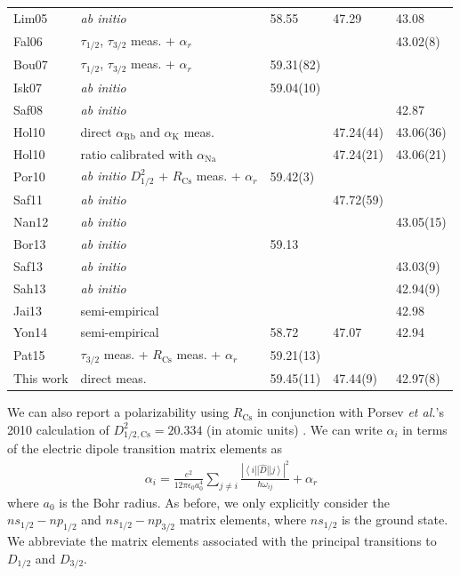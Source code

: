 \documentclass[twocolumn,pra,showpacs,superscriptaddress,longbibliography]{revtex4-1}   %
\newcommand{\brakett}[3]{\left.\left\langle #1 \right|\right|#2\left|\left| #3 \right\rangle\right.}
\newcommand{\ak}{\alpha_{\textrm{K}}}
\newcommand{\arb}{\alpha_{\textrm{Rb}}}
\newcommand{\rcs}{R_{\mathrm{Cs}}}
\newcommand{\etal}{\textit{et al.}}
\newcommand{\abinit}{\textit{ab initio} }
\begin{document}
\begin{table}
\begin{center}
\begin{tabular}{l l l l l}
Lim05 \cite{Lim2005} & \abinit & 58.55 & 47.29 & 43.08 \\
Fal06 \cite{Falke2006a,Safronova2006}  & $\tau_{1/2}$, $\tau_{3/2}$ meas. + $\alpha_r$& & & 43.02(8) \\
Bou07 \cite{Bouloufa2007,Derevianko2001} & $\tau_{1/2}$, $\tau_{3/2}$ meas. + $\alpha_r$ & 59.31(82) & & \\
Isk07 \cite{Iskrenova-Tchoukova2007} & \abinit & 59.04(10) & & \\
Saf08 \cite{Safronova2008} & \abinit & & & 42.87 \\
Hol10 \cite{Holmgren2010} & direct $\arb$ and $\ak$ meas. & & 47.24(44) & 43.06(36) \\
Hol10 \cite{Holmgren2010,Ekstrom1995} & ratio calibrated with $\alpha_{\text{Na}}$ & & 47.24(21) & 43.06(21) \\
Por10 \cite{Porsev2010,Rafac1998,Derevianko2001} & \abinit $D_{1/2}^2$ + $\rcs$ meas. + $\alpha_r$ & 59.42(3) & & \\
Saf11 \cite{Safronova2011} & \abinit & & 47.72(59) & \\
Nan12 \cite{Nandy2012} & \abinit & & & 43.05(15) \\
Bor13 \cite{Borschevsky2013} & \abinit & 59.13 & & \\
Saf13 \cite{Safronova2013} & \abinit & & & 43.03(9) \\
Sah13 \cite{Sahoo2013} & \abinit & & & 42.94(9) \\
Jai13 \cite{Jiang2013} & semi-empirical & & & 42.98 \\
Yon14 \cite{Y.-B.2014} & semi-empirical & 58.72 & 47.07 & 42.94 \\
Pat15 \cite{Patterson2015,Rafac1998,Derevianko2001}  & $\tau_{3/2}$ meas. + $\rcs$ meas. + $\alpha_r$ & 59.21(13) & & \\
This work & direct meas. & 59.45(11) & 47.44(9) & 42.97(8) \\
\hline\hline
\end{tabular}
\end{center}
\end{table}
\endgroup

We can also report a polarizability using $\rcs$ \cite{Rafac1998} in conjunction with Porsev \etal's 2010 calculation of $D_{1/2,\mathrm{Cs}}^2 = 20.334$ (in atomic units) \cite{Porsev2010}.
We can write $\alpha_i$ in terms of the electric dipole transition matrix elements as
\begin{align}
	\alpha_i = \frac{e^2}{12 \pi \epsilon_0 a_0^4} \sum_{j\neq i}	
	\frac{\left|\brakett{i}{\hat{D}}{j}\right|^2}{\hbar\omega_{ij}}	
	+ \alpha_r
	\label{polFromMatrixElements}
\end{align}
where $a_0$ is the Bohr radius. 
As before, we only explicitly consider the $ns_{1/2}-np_{1/2}$ and $ns_{1/2}-np_{3/2}$ matrix elements, 
where $ns_{1/2}$ is the ground state.
We abbreviate the matrix elements associated with the principal transitions to $D_{1/2}$ and $D_{3/2}$.
\end{document}
